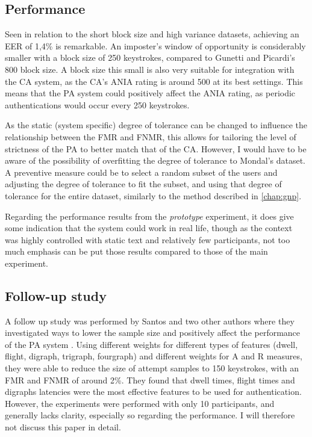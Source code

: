 \documentclass[informationsecurity]{gucmasterproject}
\begin{document}
\subsection{Performance}
Seen in relation to the short block size and high variance datasets, achieving an EER of 1,4\% is remarkable.
An imposter's window of opportunity is considerably smaller with a block size of 250 keystrokes, compared to Gunetti and Picardi's 800 block size.
A block size this small is also very suitable for integration with the CA system, as the CA's ANIA rating is around 500 \cite{mondal} at its best settings.
This means that the PA system could positively affect the ANIA rating, as periodic authentications would occur every 250 keystrokes.

As the static (system specific) degree of tolerance can be changed to influence the relationship between the FMR and FNMR, this allows for tailoring the level of strictness of the PA to better match that of the CA.
However, I would have to be aware of the possibility of overfitting the degree of tolerance to Mondal's dataset.
A preventive measure could be to select a random subset of the users and adjusting the degree of tolerance to fit the subset, and using that degree of tolerance for the entire dataset, similarly to the method described in \cref{chap:gnp}.

Regarding the performance results from the \textit{prototype} experiment, it does give some indication that the system could work in real life, though as the context was highly controlled with static text and relatively few participants, not too much emphasis can be put those results compared to those of the main experiment.




\subsection{Follow-up study}
A follow up study was performed by Santos and two other authors where they investigated ways to lower the sample size and positively affect the performance of the PA system \cite{Pinto2014}.
Using different weights for different types of features (dwell, flight, digraph, trigraph, fourgraph) and different weights for A and R measures, they were able to reduce the size of attempt samples to 150 keystrokes, with an FMR and FNMR of around 2\%.
They found that dwell times, flight times and digraphs latencies were the most effective features to be used for authentication.
However, the experiments were performed with only 10 participants, and generally lacks clarity, especially so regarding the performance.
I will therefore not discuss this paper in detail.
\end{document}
